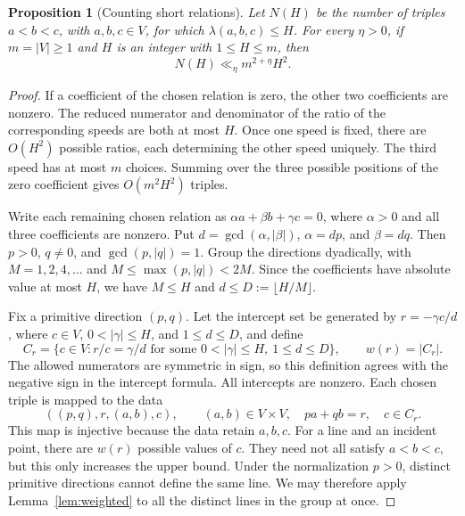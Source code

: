 \documentclass[12pt,leqno]{article}
\numberwithin{equation}{section}
\newtheorem{proposition}[theorem]{Proposition}
\theoremstyle{remark}
\begin{document}
\begin{proposition}[Counting short relations]\label{prop:relationcount}
Let $N(H)$ be the number of triples $a<b<c$, with $a,b,c\in V$, for which $\lambda(a,b,c)\le H$. For every $\eta>0$, if $m=|V|\ge1$ and $H$ is an integer with $1\le H\le m$, then
\begin{equation}\label{eq:NH}
N(H)\ll_\eta m^{2+\eta}H^2.
\end{equation}
\end{proposition}
\begin{proof}
If a coefficient of the chosen relation is zero, the other two coefficients are nonzero. The reduced numerator and denominator of the ratio of the corresponding speeds are both at most $H$. Once one speed is fixed, there are $O(H^2)$ possible ratios, each determining the other speed uniquely. The third speed has at most $m$ choices. Summing over the three possible positions of the zero coefficient gives $O(m^2H^2)$ triples.

Write each remaining chosen relation as $\alpha a+\beta b+\gamma c=0$, where $\alpha>0$ and all three coefficients are nonzero. Put $d=\gcd(\alpha,|\beta|)$, $\alpha=dp$, and $\beta=dq$. Then $p>0$, $q\ne0$, and $\gcd(p,|q|)=1$. Group the directions dyadically, with $M=1,2,4,\ldots$ and $M\le\max(p,|q|)<2M$. Since the coefficients have absolute value at most $H$, we have $M\le H$ and $d\le D:=\lfloor H/M\rfloor$.

Fix a primitive direction $(p,q)$. Let the intercept set be generated by $r=-\gamma c/d$, where $c\in V$, $0<|\gamma|\le H$, and $1\le d\le D$, and define
\[
C_r=\{c\in V:r/c=\gamma/d\text{ for some }0<|\gamma|\le H,\ 1\le d\le D\},
\qquad w(r)=|C_r|.
\]
The allowed numerators are symmetric in sign, so this definition agrees with the negative sign in the intercept formula. All intercepts are nonzero. Each chosen triple is mapped to the data
\[
((p,q),r,(a,b),c),\qquad (a,b)\in V\times V,\quad p a+q b=r,\quad c\in C_r.
\]
This map is injective because the data retain $a,b,c$. For a line and an incident point, there are $w(r)$ possible values of $c$. They need not all satisfy $a<b<c$, but this only increases the upper bound. Under the normalization $p>0$, distinct primitive directions cannot define the same line. We may therefore apply Lemma~\ref{lem:weighted} to all the distinct lines in the group at once.


\end{proof}
\end{document}
